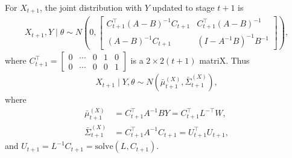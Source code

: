 For $X_{t+1}$, the joint distribution with $Y$ updated to stage $t+1$ is 
\begin{align*}
X_{t+1}, Y\mid \theta \sim N\left( 0, \begin{bmatrix}
C_{t+1}^\top(A-B) ^{-1}C_{t+1} & C_{t+1}^\top (A-B)^{-1}\\
(A-B)^{-1}C_{t+1} & (I- A^{-1}B) ^{-1}B^{-1}
\end{bmatrix} \right),
\end{align*}
where $C_{t+1}^\top = \begin{bmatrix}
0 & \cdots & 0 & 1 & 0 \\
0 & \cdots & 0 & 0 & 1
\end{bmatrix}$ is a $2 \times 2(t+1)$ matriX. Thus
\begin{align*}
X_{t+1}\mid Y,\theta \sim N(\bar{\mu}_{t+1}^{(X)},\bar{\Sigma}_{t+1}^{(X)}),
\end{align*}
where
\begin{align*}
\bar{\mu}_{t+1}^{(X)} & = C_{t+1}^\top A^{-1}BY =C_{t+1}^\top L^{-\top}W,\\
\bar{\Sigma}_{t+1}^{(X)} & =C_{t+1}^\top A^{-1}C_{t+1} =U_{t+1}^\top U_{t+1},
\end{align*}
and $U_{t+1} = L^{-1} C_{t+1} = \mbox{solve}(L,C_{t+1})$.

